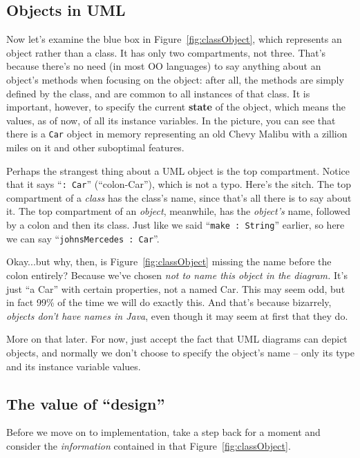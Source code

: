 \subsection{Objects in UML}

Now let's examine the blue box in Figure~\ref{fig:classObject}, which
represents an object rather than a class. It has only two compartments, not
three. That's because there's no need (in most OO languages) to say anything
about an object's methods when focusing on the object: after all, the methods
are simply defined by the class, and are common to all instances of that class.
It is important, however, to specify the current \textbf{state} of the object,
which means the values, as of now, of all its instance variables. In the
picture, you can see that there is a \texttt{Car} object in memory representing
an old Chevy Malibu with a zillion miles on it and other suboptimal features.

Perhaps the strangest thing about a UML object is the top compartment. Notice
that it says ``\texttt{:~Car}'' (``colon-Car''), which is not a typo. Here's
the sitch. The top compartment of a \textit{class} has the class's name, since
that's all there is to say about it. The top compartment of an \textit{object},
meanwhile, has the \textit{object's} name, followed by a colon and then its
class. Just like we said ``\texttt{make :~String}'' earlier, so here we can
say ``\texttt{johnsMercedes :~Car}''.

Okay...but why, then, is Figure~\ref{fig:classObject} missing the name before
the colon entirely? Because we've chosen \textit{not to name this object in the
diagram.} It's just ``a Car'' with certain properties, not a named Car. This
may seem odd, but in fact 99\% of the time we will do exactly this. And that's
because bizarrely, \textit{objects don't have names in Java}, even though it
may seem at first that they do.

More on that later. For now, just accept the fact that UML diagrams can depict
objects, and normally we don't choose to specify the object's name -- only its
type and its instance variable values.


\subsection{The value of ``design''}

Before we move on to implementation, take a step back for a moment and
consider the \textit{information} contained in that
Figure~\ref{fig:classObject}.

